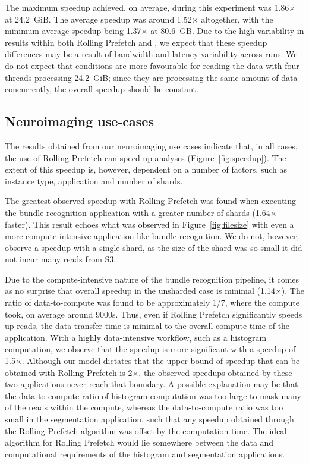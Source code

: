 The maximum speedup achieved, on average, during this experiment was 1.86$\times$ at 24.2~GiB. The average speedup
was around 1.52$\times$ altogether, with the minimum average speedup being 1.37$\times$ at 80.6~GB. Due to the high
variability in results within both Rolling Prefetch and \sfs, we expect that these speedup differences may be a
result of bandwidth and latency variability across runs. We do not expect that conditions are more favourable
for reading the data with four threads processing 24.2~GiB; since they are processing the
same amount of data concurrently, the overall speedup should be constant.

\subsection{Neuroimaging use-cases}

The results obtained from our neuroimaging use cases indicate that, in all
cases, the use of Rolling Prefetch can speed up analyses (Figure~\ref{fig:speedup}).
The extent of this speedup is, however, dependent on a number of
factors, such as instance type, application and number of shards.

The greatest observed speedup with Rolling Prefetch was found when executing the bundle recognition application
with a greater number of shards (1.64$\times$ faster). This result echoes what was observed in Figure~\ref{fig:filesize} with even a more compute-intensive application like 
bundle recognition. We do not, however, observe a speedup with a single shard, as the size of the shard was so small it did not incur many reads from S3.

Due to the compute-intensive nature of the bundle recognition pipeline, it comes as no
surprise that overall speedup in the unsharded case is minimal (1.14$\times$). The ratio of data-to-compute was found to be approximately 1/7, where the compute took, on average around 9000s. Thus, even if Rolling Prefetch significantly speeds up reads, the data transfer time is
minimal to the overall compute time of the application. With a highly data-intensive
workflow, such as a histogram computation, we observe that the speedup is more
significant with a speedup of 1.5$\times$. Although our model dictates that the upper bound
of speedup that can be obtained with Rolling Prefetch is 2$\times$, the observed speedups
obtained by these two applications never reach that boundary. A possible explanation may be that the data-to-compute ratio of histogram computation was too large to mask many of
the reads within the compute, whereas the data-to-compute ratio was too small in the segmentation application, such that any speedup obtained
through the Rolling Prefetch algorithm was offset by the computation time. The ideal
algorithm for Rolling Prefetch would lie somewhere between the data and computational
requirements of the histogram and segmentation applications.

